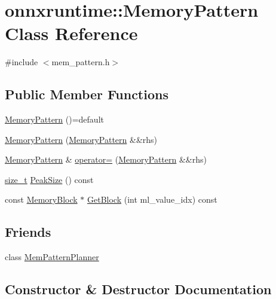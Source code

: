 \hypertarget{classonnxruntime_1_1MemoryPattern}{}\section{onnxruntime\+:\+:Memory\+Pattern Class Reference}
\label{classonnxruntime_1_1MemoryPattern}


{\ttfamily \#include $<$mem\+\_\+pattern.\+h$>$}

\subsection*{Public Member Functions}
\begin{DoxyCompactItemize}
\item 
\mbox{\hyperlink{classonnxruntime_1_1MemoryPattern_a6d6d1c67dbc9bff7cc9ce9d38508e00c}{Memory\+Pattern}} ()=default
\item 
\mbox{\hyperlink{classonnxruntime_1_1MemoryPattern_af15769f849757f058bf01621126e9d1d}{Memory\+Pattern}} (\mbox{\hyperlink{classonnxruntime_1_1MemoryPattern}{Memory\+Pattern}} \&\&rhs)
\item 
\mbox{\hyperlink{classonnxruntime_1_1MemoryPattern}{Memory\+Pattern}} \& \mbox{\hyperlink{classonnxruntime_1_1MemoryPattern_a8560ab094f5c6a3fe43aa88a4efb3d11}{operator=}} (\mbox{\hyperlink{classonnxruntime_1_1MemoryPattern}{Memory\+Pattern}} \&\&rhs)
\item 
\mbox{\hyperlink{mlasi_8h_a503efbc1c6e50825320ad909366b78ab}{size\+\_\+t}} \mbox{\hyperlink{classonnxruntime_1_1MemoryPattern_a61a44707c0b66b5a982538d4d077eba8}{Peak\+Size}} () const
\item 
const \mbox{\hyperlink{structonnxruntime_1_1MemoryBlock}{Memory\+Block}} $\ast$ \mbox{\hyperlink{classonnxruntime_1_1MemoryPattern_a98a28a361c9db40e72e4cf8479738032}{Get\+Block}} (int ml\+\_\+value\+\_\+idx) const
\end{DoxyCompactItemize}
\subsection*{Friends}
\begin{DoxyCompactItemize}
\item 
class \mbox{\hyperlink{classonnxruntime_1_1MemoryPattern_aa36168f9ccd4b68ca71a05b1c108237c}{Mem\+Pattern\+Planner}}
\end{DoxyCompactItemize}


\subsection{Constructor \& Destructor Documentation}
\mbox{\label{classonnxruntime_1_1MemoryPattern_a6d6d1c67dbc9bff7cc9ce9d38508e00c}} 
